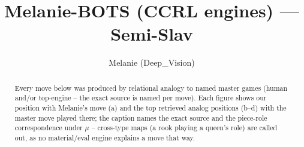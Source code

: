 \documentclass[11pt]{article}
\title{Melanie-BOTS (CCRL engines) — Semi-Slav}
\author{Melanie (Deep\_Vision)}
\date{}
\begin{document}
\maketitle

\begin{abstract}Every move below was produced by relational analogy to named master games (human and/or top-engine -- the exact source is named per move). Each figure shows our position with Melanie's move (a) and the top retrieved analog positions (b--d) with the master move played there; the caption names the exact source and the piece-role correspondence under $\mu$ -- cross-type maps (a rook playing a queen's role) are called out, as no material/eval engine explains a move that way.\end{abstract}

\begin{figure}[p]\centering
\begin{subfigure}{0.46\textwidth}\centering
\resizebox{\linewidth}{!}{%
\newchessgame
\chessboard[
  setfen={r1bqkb1r/pp1n1ppp/2p1pn2/8/2pP4/2NBPN2/PP3PPP/R1BQ1RK1 b kq - 1 7},
  showmover=false,
  pgfstyle=straightmove, color=movearrow, markmove={e8-e7}
]}
\caption{}
\end{subfigure}\hfill
\begin{subfigure}{0.46\textwidth}\centering
\resizebox{\linewidth}{!}{%
\newchessgame
\chessboard[
  setfen={r1bqk2r/pppnbppp/4pn2/3p2B1/2PP4/2N1PN2/PP3PPP/R2QKB1R b KQkq - 2 6},
  showmover=false,
  pgfstyle=straightmove, color=movearrow, markmove={e8-g8}
]}
\caption{}
\end{subfigure}
\\[4pt]
\begin{subfigure}{0.46\textwidth}\centering
\resizebox{\linewidth}{!}{%
\newchessgame
\chessboard[
  setfen={r1bqk2r/pppnbppp/4pn2/3p2B1/2PP4/2N1PN2/PP3PPP/R2QKB1R b KQkq - 0 6},
  showmover=false,
  pgfstyle=straightmove, color=movearrow, markmove={e8-g8}
]}
\caption{}
\end{subfigure}\hfill
\begin{subfigure}{0.46\textwidth}\centering
\resizebox{\linewidth}{!}{%
\newchessgame
\chessboard[
  setfen={r1bqk2r/pppnbppp/4pn2/3p2B1/2PP4/2N1PN2/PP3PPP/R2QKB1R b KQkq - 0 6},
  showmover=false,
  pgfstyle=straightmove, color=movearrow, markmove={e8-g8}
]}
\caption{}
\end{subfigure}

\end{figure}
\end{document}
